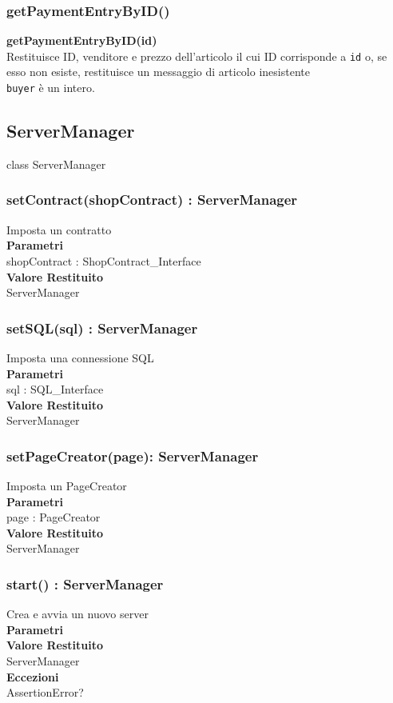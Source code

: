 \documentclass[a4paper, 12pt]{article}
\begin{document}
\subsubsection{getPaymentEntryByID()}
\textbf{getPaymentEntryByID(id)} \\
Restituisce ID, venditore e prezzo dell'articolo il cui ID corrisponde a \texttt{id} o, se esso non esiste, restituisce un messaggio di articolo inesistente \\
\texttt{buyer} è un intero.

\subsection{ServerManager}
class ServerManager
\subsubsection{setContract(shopContract) : ServerManager}
Imposta un contratto\\
\textbf{Parametri}\\
shopContract : ShopContract\_Interface\\
\textbf{Valore Restituito}\\
ServerManager\\
\subsubsection{setSQL(sql) : ServerManager}
Imposta una connessione SQL\\
\textbf{Parametri}\\
sql : SQL\_Interface\\
\textbf{Valore Restituito}\\
ServerManager
\subsubsection{setPageCreator(page): ServerManager}
Imposta un PageCreator\\
\textbf{Parametri}\\
page : PageCreator\\
\textbf{Valore Restituito}\\
ServerManager
\subsubsection{start() : ServerManager}
Crea e avvia un nuovo server\\
\textbf{Parametri}\\
\textbf{Valore Restituito}\\
ServerManager\\
\textbf{Eccezioni}\\
AssertionError?
\end{document}
